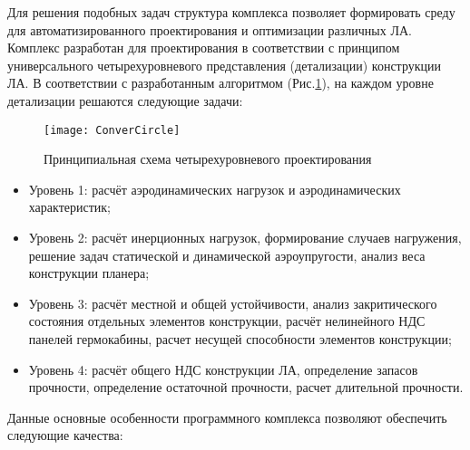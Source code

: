 \label{sec:Conver}


Для решения подобных задач структура комплекса позволяет формировать среду для автоматизированного проектирования и оптимизации различных ЛА. Комплекс разработан для проектирования в соответствии с принципом универсального четырехуровневого представления (детализации) конструкции ЛА. В соответствии с разработанным алгоритмом (Рис.\ref{fig:ConverCircle}), на каждом уровне детализации решаются следующие задачи:




\begin{figure}[ht]
\centering
\texttt{[image: ConverCircle]} 
\caption{Принципиальная схема четырехуровневого проектирования}
\label{fig:ConverCircle}
\end{figure}



\begin{itemize}
\item Уровень 1: расчёт аэродинамических нагрузок и аэродинамических характеристик; 
\item Уровень 2: расчёт инерционных нагрузок, формирование случаев нагружения, решение задач статической и динамической аэроупругости, анализ веса конструкции планера;
\item Уровень 3: расчёт местной и общей устойчивости, анализ закритического состояния отдельных элементов конструкции, расчёт нелинейного НДС панелей гермокабины, расчет несущей способности элементов конструкции;
\item Уровень 4: расчёт общего НДС конструкции ЛА, определение запасов прочности, определение остаточной прочности, расчет длительной прочности.
\end{itemize}

Данные основные особенности программного комплекса позволяют обеспечить следующие качества:

